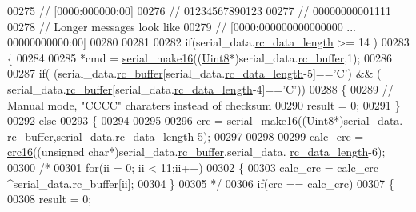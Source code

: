 \begin{DoxyCode}
00275         \textcolor{comment}{// [0000:000000:00]}
00276         \textcolor{comment}{// 01234567890123}
00277         \textcolor{comment}{// 00000000001111}
00278         \textcolor{comment}{// Longer messages look like}
00279         \textcolor{comment}{// [0000:000000000000000  ... 00000000000:00]}
00280 
00281 
00282         \textcolor{keywordflow}{if}(serial\_data.\hyperlink{a00030_ab136d4fef2c523afd55b6ca74c46d7cc}{rc\_data\_length} >= 14 )
00283         \{
00284 
00285             *cmd = \hyperlink{a00030_abc17de32f14103a5be219df0d4ad9176}{serial\_make16}((\hyperlink{a00072_af84840501dec18061d18a68c162a8fa2}{Uint8}*)serial\_data.\hyperlink{a00030_ac734cb8be27f86bd99edc539434883a4}{rc\_buffer},1);
00286 
00287             \textcolor{keywordflow}{if}( (serial\_data.\hyperlink{a00030_ac734cb8be27f86bd99edc539434883a4}{rc\_buffer}[serial\_data.\hyperlink{a00030_ab136d4fef2c523afd55b6ca74c46d7cc}{rc\_data\_length}-5]==\textcolor{charliteral}{'C'}) && (
      serial\_data.\hyperlink{a00030_ac734cb8be27f86bd99edc539434883a4}{rc\_buffer}[serial\_data.\hyperlink{a00030_ab136d4fef2c523afd55b6ca74c46d7cc}{rc\_data\_length}-4]==\textcolor{charliteral}{'C'}))
00288             \{
00289                 \textcolor{comment}{// Manual mode, "CCCC" charaters instead of checksum}
00290                 result = 0;
00291             \}
00292             \textcolor{keywordflow}{else}
00293             \{
00294 
00295                 
00296                 crc  = \hyperlink{a00030_abc17de32f14103a5be219df0d4ad9176}{serial\_make16}((\hyperlink{a00072_af84840501dec18061d18a68c162a8fa2}{Uint8}*)serial\_data.
      \hyperlink{a00030_ac734cb8be27f86bd99edc539434883a4}{rc\_buffer},serial\_data.\hyperlink{a00030_ab136d4fef2c523afd55b6ca74c46d7cc}{rc\_data\_length}-5);
00297                 
00298            
00299                 calc\_crc = \hyperlink{a00021_a6553827687db2137ee550ad6e1d2f316}{crc16}((\textcolor{keywordtype}{unsigned} \textcolor{keywordtype}{char}*)serial\_data.\hyperlink{a00030_ac734cb8be27f86bd99edc539434883a4}{rc\_buffer},serial\_data.
      \hyperlink{a00030_ab136d4fef2c523afd55b6ca74c46d7cc}{rc\_data\_length}-6);
00300               \textcolor{comment}{/*}
00301 \textcolor{comment}{                for(ii = 0; ii < 11;ii++)}
00302 \textcolor{comment}{                \{}
00303 \textcolor{comment}{                    calc\_crc = calc\_crc ^serial\_data.rc\_buffer[ii];}
00304 \textcolor{comment}{                \}}
00305 \textcolor{comment}{              */}
00306                 \textcolor{keywordflow}{if}(crc == calc\_crc)
00307                 \{
00308                     result = 0;

\end{DoxyCode}
